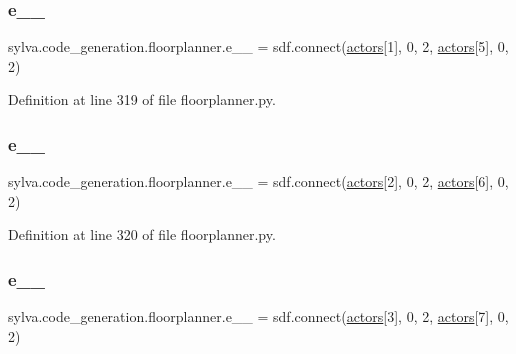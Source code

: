 \subsubsection{\texorpdfstring{e\+\_\+\_}{e\_1\_5}}
{\footnotesize\ttfamily sylva.\+code\+\_\+generation.\+floorplanner.\+e\+\_\+\_ = sdf.\+connect(\hyperlink{namespacesylva_1_1code__generation_1_1floorplanner_a0a7a26c9bd92be126f3b70c232ba81cd}{actors}\mbox{[}1\mbox{]}, 0, 2, \hyperlink{namespacesylva_1_1code__generation_1_1floorplanner_a0a7a26c9bd92be126f3b70c232ba81cd}{actors}\mbox{[}5\mbox{]}, 0, 2)}



Definition at line 319 of file floorplanner.\+py.

\mbox{\label{namespacesylva_1_1code__generation_1_1floorplanner_a92d430f20ce6fb4ddcb58b15ea63a296}} 
\subsubsection{\texorpdfstring{e\+\_\+\_}{e\_2\_6}}
{\footnotesize\ttfamily sylva.\+code\+\_\+generation.\+floorplanner.\+e\+\_\+\_ = sdf.\+connect(\hyperlink{namespacesylva_1_1code__generation_1_1floorplanner_a0a7a26c9bd92be126f3b70c232ba81cd}{actors}\mbox{[}2\mbox{]}, 0, 2, \hyperlink{namespacesylva_1_1code__generation_1_1floorplanner_a0a7a26c9bd92be126f3b70c232ba81cd}{actors}\mbox{[}6\mbox{]}, 0, 2)}



Definition at line 320 of file floorplanner.\+py.

\mbox{\label{namespacesylva_1_1code__generation_1_1floorplanner_ae1e7847c93e7175881e7d072e0b64785}} 
\subsubsection{\texorpdfstring{e\+\_\+\_}{e\_3\_7}}
{\footnotesize\ttfamily sylva.\+code\+\_\+generation.\+floorplanner.\+e\+\_\+\_ = sdf.\+connect(\hyperlink{namespacesylva_1_1code__generation_1_1floorplanner_a0a7a26c9bd92be126f3b70c232ba81cd}{actors}\mbox{[}3\mbox{]}, 0, 2, \hyperlink{namespacesylva_1_1code__generation_1_1floorplanner_a0a7a26c9bd92be126f3b70c232ba81cd}{actors}\mbox{[}7\mbox{]}, 0, 2)}



